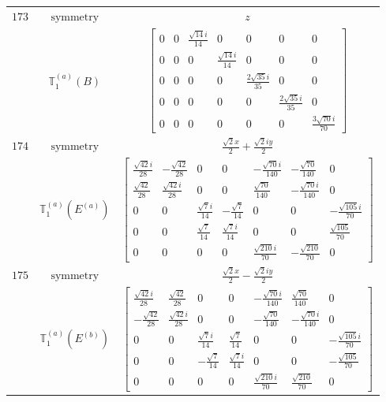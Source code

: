 \documentclass[fleqn,8pt,landscape]{jsarticle}
\begin{document}
\begin{longtable}{ccc}
$ 173 $ & $ \text{symmetry} $ & $ z $ \\
$  $ & $ \mathbb{T}_{1}^{(a)}(B) $ & $ \begin{bmatrix} 0 & 0 & \frac{\sqrt{14} i}{14} & 0 & 0 & 0 & 0 \\ 0 & 0 & 0 & \frac{\sqrt{14} i}{14} & 0 & 0 & 0 \\ 0 & 0 & 0 & 0 & \frac{2 \sqrt{35} i}{35} & 0 & 0 \\ 0 & 0 & 0 & 0 & 0 & \frac{2 \sqrt{35} i}{35} & 0 \\ 0 & 0 & 0 & 0 & 0 & 0 & \frac{3 \sqrt{70} i}{70} \end{bmatrix} $ \\ \hline
$ 174 $ & $ \text{symmetry} $ & $ \frac{\sqrt{2} x}{2} + \frac{\sqrt{2} i y}{2} $ \\
$  $ & $ \mathbb{T}_{1}^{(a)}(E^{(a)}) $ & $ \begin{bmatrix} \frac{\sqrt{42} i}{28} & - \frac{\sqrt{42}}{28} & 0 & 0 & - \frac{\sqrt{70} i}{140} & - \frac{\sqrt{70}}{140} & 0 \\ \frac{\sqrt{42}}{28} & \frac{\sqrt{42} i}{28} & 0 & 0 & \frac{\sqrt{70}}{140} & - \frac{\sqrt{70} i}{140} & 0 \\ 0 & 0 & \frac{\sqrt{7} i}{14} & - \frac{\sqrt{7}}{14} & 0 & 0 & - \frac{\sqrt{105} i}{70} \\ 0 & 0 & \frac{\sqrt{7}}{14} & \frac{\sqrt{7} i}{14} & 0 & 0 & \frac{\sqrt{105}}{70} \\ 0 & 0 & 0 & 0 & \frac{\sqrt{210} i}{70} & - \frac{\sqrt{210}}{70} & 0 \end{bmatrix} $ \\ \hline
$ 175 $ & $ \text{symmetry} $ & $ \frac{\sqrt{2} x}{2} - \frac{\sqrt{2} i y}{2} $ \\
$  $ & $ \mathbb{T}_{1}^{(a)}(E^{(b)}) $ & $ \begin{bmatrix} \frac{\sqrt{42} i}{28} & \frac{\sqrt{42}}{28} & 0 & 0 & - \frac{\sqrt{70} i}{140} & \frac{\sqrt{70}}{140} & 0 \\ - \frac{\sqrt{42}}{28} & \frac{\sqrt{42} i}{28} & 0 & 0 & - \frac{\sqrt{70}}{140} & - \frac{\sqrt{70} i}{140} & 0 \\ 0 & 0 & \frac{\sqrt{7} i}{14} & \frac{\sqrt{7}}{14} & 0 & 0 & - \frac{\sqrt{105} i}{70} \\ 0 & 0 & - \frac{\sqrt{7}}{14} & \frac{\sqrt{7} i}{14} & 0 & 0 & - \frac{\sqrt{105}}{70} \\ 0 & 0 & 0 & 0 & \frac{\sqrt{210} i}{70} & \frac{\sqrt{210}}{70} & 0 \end{bmatrix} $ \\ \hline

\end{longtable}
\end{document}
